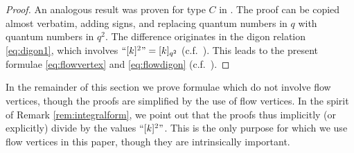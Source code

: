 \documentclass[10pt]{amsart}
\numberwithin{equation}{section}
\theoremstyle{definition}
\begin{document}
\begin{proof}
An analogous result was proven for type $C$ in \cite[Lemma 3.4]{BERT}. 
The proof can be copied almost verbatim, adding signs, and replacing quantum numbers in $q$ with quantum numbers in $q^2$. 
The difference originates in the digon relation \eqref{eq:digon1}, which involves $``[k]^2"=[k]_{q^{2}}$ 
(c.f.~\cite[Equation (1.2c)]{BERT}).
This leads to the present formulae \eqref{eq:flowvertex} and \eqref{eq:flowdigon}
(c.f.~\cite[Equations (3.3) and (3.4)]{BERT}).
\end{proof}

In the remainder of this section we prove formulae which do not involve flow vertices, 
though the proofs are simplified by the use of flow vertices. 
In the spirit of Remark \ref{rem:integralform}, we point out that
the proofs thus implicitly (or explicitly) divide by the values $``[k]^2"$. 
This is the only purpose for which we use flow vertices in this paper, 
though they are intrinsically important.
	
\end{document}
